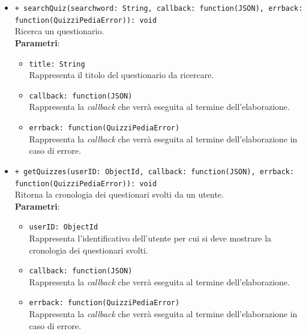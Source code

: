 \begin{itemize}
\begin{itemize}
			\item \texttt{+ searchQuiz(searchword: String, callback: function(JSON), errback: function(QuizziPediaError)): void}\\
			Ricerca un questionario.\\
			\textbf{Parametri}:
			\begin{itemize}
				\item \texttt{title: String}\\
				Rappresenta il titolo del questionario da ricercare.
				\item \texttt{callback: function(JSON)}\\
				Rappresenta la \textit{callback} che verrà eseguita al termine dell'elaborazione.
				\item \texttt{errback: function(QuizziPediaError)}\\
				Rappresenta la \textit{callback} che verrà eseguita al termine dell'elaborazione in caso di errore.
			\end{itemize}
			
			\item \texttt{+ getQuizzes(userID: ObjectId, callback: function(JSON), errback: function(QuizziPediaError)): void}\\
			Ritorna la cronologia dei questionari svolti da un utente.\\
			\textbf{Parametri}:
			\begin{itemize}
				\item \texttt{userID: ObjectId}\\
				Rappresenta l'identificativo dell'utente per cui si deve mostrare la cronologia dei questionari svolti.
				\item \texttt{callback: function(JSON)}\\
				Rappresenta la \textit{callback} che verrà eseguita al termine dell'elaborazione.
				\item \texttt{errback: function(QuizziPediaError)}\\
				Rappresenta la \textit{callback} che verrà eseguita al termine dell'elaborazione in caso di errore.
			\end{itemize}
		\end{itemize}
\end{itemize}